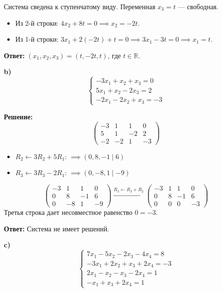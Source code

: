 \documentclass[11pt, a4paper]{article}
\begin{document}
Система сведена к ступенчатому виду. Переменная $x_3 = t$ --- свободная.
\begin{itemize}
\item Из 2-й строки: $4x_2 + 8t = 0 \implies x_2 = -2t$.
\item Из 1-й строки: $3x_1 + 2(-2t) + t = 0 \implies 3x_1 - 3t = 0 \implies x_1 = t$.
\end{itemize}

\textbf{Ответ:} $(x_1, x_2, x_3) = (t, -2t, t)$, где $t \in \mathbb{R}$.

\medskip
\textbf{b)}
$$ \begin{cases} -3x_1 + x_2 + x_3 = 0 \\ 5x_1 + x_2 - 2x_3 = 2 \\ -2x_1 - 2x_2 + x_3 = -3 \end{cases} $$

\textbf{Решение:}
$$ \left(\begin{array}{ccc|c} -3 & 1 & 1 & 0 \\ 5 & 1 & -2 & 2 \\ -2 & -2 & 1 & -3 \end{array}\right) $$
\begin{itemize}
\item $R_2 \leftarrow 3R_2 + 5R_1$: $\implies (0, 8, -1 \mid 6)$
\item $R_3 \leftarrow 3R_3 - 2R_1$: $\implies (0, -8, 1 \mid -9)$
\end{itemize}
$$ \left(\begin{array}{ccc|c} -3 & 1 & 1 & 0 \\ 0 & 8 & -1 & 6 \\ 0 & -8 & 1 & -9 \end{array}\right) \xrightarrow{R_3 \leftarrow R_3 + R_2} \left(\begin{array}{ccc|c} -3 & 1 & 1 & 0 \\ 0 & 8 & -1 & 6 \\ 0 & 0 & 0 & -3 \end{array}\right) $$
Третья строка дает несовместное равенство $0 = -3$.

\textbf{Ответ:} Система не имеет решений.

\medskip
\textbf{c)}
$$ \begin{cases} 7x_1 - 5x_2 - 2x_3 - 4x_4 = 8 \\ -3x_1 + 2x_2 + x_3 + 2x_4 = -3 \\ 2x_1 - x_2 - x_3 - 2x_4 = 1 \\ -x_1 + x_3 + 2x_4 = 1 \end{cases} $$
\end{document}
